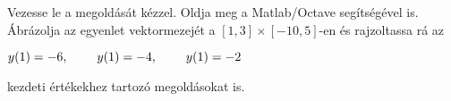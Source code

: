 Vezesse le a 
\de{} megoldását kézzel. 
Oldja meg a Matlab/Octave   segítségével is. 
Ábrázolja az egyenlet vektormezejét a $[1,3]\times [-10,5]$-en és rajzoltassa rá 
az 
\centerline{$y(1)=-6, \hspace{0.8cm} y(1)=-4, \hspace{0.8cm} y(1)=-2$} 
kezdeti értékekhez tartozó megoldásokat is.



